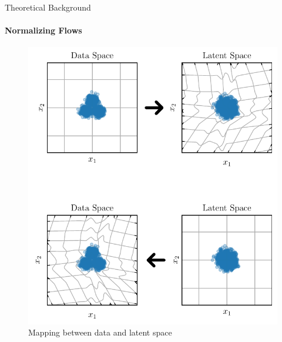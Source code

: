 \documentclass[aspectratio=169]{beamer}
\begin{document}
\begin{frame}{Theoretical Background}
    \framesubtitle{Normalizing Flows}

    \begin{figure}[htpb]
        \includegraphics[height=0.7\textheight]{beamer-figures/toy_example/gaussian_mixture/grid_transformed.pdf}
        \caption{Mapping between data and latent space}%
    \end{figure}
\end{frame}
\end{document}
